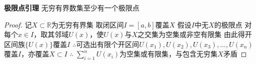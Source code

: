 \documentclass[11pt]{article}
\begin{document}
\textbf{极限点引理} \newline
无穷有界数集至少有一个极限点 \newline
\begin{proof}
  记$X\subset\mathbb{R}$为无穷有界集 \newline
  取闭区间$I=[a,b]$覆盖$X$ \newline
  假设$I$中无$X$的极限点 \newline
  对每个$x\in I$，取其邻域$U(x)$，使$U(x)$与$X$之交集为空集或非空有限集 \newline
  由此得开区间族$\{U(x)\}$覆盖$I$ \newline
  $\therefore$可选出有限个开区间$U(x_1),U(x_2),U(x_3),\dots,U(x_n)$覆盖$I$，亦覆盖$X\subset I$ \newline
  $\therefore$ $\sum\limits_{i=1}^{n}U(x_i)$为空集或有限集，与包含无穷集$X$矛盾
\end{proof}
\end{document}
